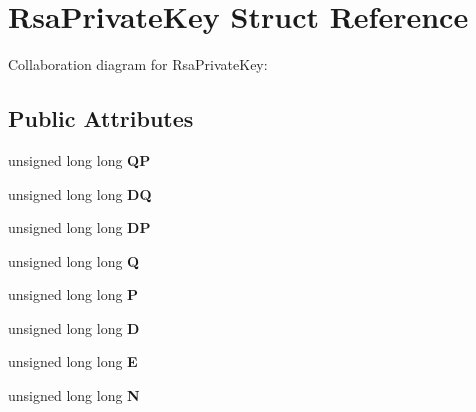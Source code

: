 \hypertarget{struct_rsa_private_key}{}\section{Rsa\+Private\+Key Struct Reference}
\label{struct_rsa_private_key}


Collaboration diagram for Rsa\+Private\+Key\+:
\subsection*{Public Attributes}
\begin{DoxyCompactItemize}
\item 
\mbox{\label{struct_rsa_private_key_a514f851f84e53585a2ea51bad9f14bd0}} 
unsigned long long {\bfseries QP}
\item 
\mbox{\label{struct_rsa_private_key_a82f6ced784c1ff40be4ec95c87be51f6}} 
unsigned long long {\bfseries DQ}
\item 
\mbox{\label{struct_rsa_private_key_aa1a61149f469f035387b1929e2584cb9}} 
unsigned long long {\bfseries DP}
\item 
\mbox{\label{struct_rsa_private_key_aeeb6ca742dff9c2ebb8f6c5193e4b2d4}} 
unsigned long long {\bfseries Q}
\item 
\mbox{\label{struct_rsa_private_key_a1e01f71467b6b2fdf13d53a35a56a7ac}} 
unsigned long long {\bfseries P}
\item 
\mbox{\label{struct_rsa_private_key_a786a10927d84ca75291f68eca9e12632}} 
unsigned long long {\bfseries D}
\item 
\mbox{\label{struct_rsa_private_key_aacff57470ff489a465a1a10221e46947}} 
unsigned long long {\bfseries E}
\item 
\mbox{\label{struct_rsa_private_key_ae46799a86b358326d67f352d44a5831f}} 
unsigned long long {\bfseries N}
\item 
\mbox{\label{struct_rsa_private_key_adc5d9d25025ac975f17485c5c1a49b37}} 

\end{DoxyCompactItemize}
